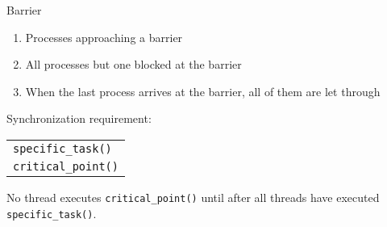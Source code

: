 \begin{frame}{Barrier}
  \begin{center}
  \end{center}
  \begin{enumerate}
  \item Processes approaching a barrier
  \item All processes but one blocked at the barrier
  \item When the last process arrives at the barrier, all of them are let through
  \end{enumerate}
  \begin{block}{Synchronization requirement:}
    \begin{center}
      \begin{tabular}{l}
        \texttt{specific\_task()}\\
        \texttt{critical\_point()}
      \end{tabular}
    \end{center}
    No thread executes \texttt{critical\_point()} until after all threads have executed
    \texttt{specific\_task()}.
  \end{block}
\end{frame}

